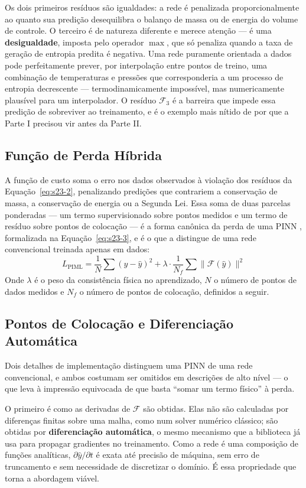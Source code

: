 \documentclass[12pt,a4paper]{article}
\numberwithin{equation}{section}
\numberwithin{table}{section}
\numberwithin{figure}{section}
\begin{document}
	Os dois primeiros resíduos são igualdades: a rede é penalizada proporcionalmente ao quanto sua predição desequilibra o balanço de massa ou de energia do volume de controle. O terceiro é de natureza diferente e merece atenção — é uma \textbf{desigualdade}, imposta pelo operador $\max$, que só penaliza quando a taxa de geração de entropia predita é negativa. Uma rede puramente orientada a dados pode perfeitamente prever, por interpolação entre pontos de treino, uma combinação de temperaturas e pressões que corresponderia a um processo de entropia decrescente — termodinamicamente impossível, mas numericamente plausível para um interpolador. O resíduo $\mathcal{F}_3$ é a barreira que impede essa predição de sobreviver ao treinamento, e é o exemplo mais nítido de por que a Parte I precisou vir antes da Parte II.

	\subsection{Função de Perda Híbrida}
	A função de custo soma o erro nos dados observados à violação dos resíduos da Equação~\eqref{eq:s23-2}, penalizando predições que contrariem a conservação de massa, a conservação de energia ou a Segunda Lei. Essa soma de duas parcelas ponderadas — um termo supervisionado sobre pontos medidos e um termo de resíduo sobre pontos de colocação — é a forma canônica da perda de uma PINN \cite{piml}, formalizada na Equação~\eqref{eq:s23-3}, e é o que a distingue de uma rede convencional treinada apenas em dados:
	\begin{equation}\label{eq:s23-3}
 L_{\text{PIML}} = \frac{1}{N} \sum (y - \hat{y})^2 + \lambda \cdotp \frac{1}{N_f} \sum \| \mathcal{F}(\hat{y}) \|^2
\end{equation}
	Onde $\lambda$ é o peso da consistência física no aprendizado, $N$ o número de pontos de dados medidos e $N_f$ o número de pontos de colocação, definidos a seguir.

	\subsection{Pontos de Colocação e Diferenciação Automática}

	Dois detalhes de implementação distinguem uma PINN de uma rede convencional, e ambos costumam ser omitidos em descrições de alto nível — o que leva à impressão equivocada de que basta ``somar um termo físico'' à perda.

	O primeiro é como as derivadas de $\mathcal{F}$ são obtidas. Elas não são calculadas por diferenças finitas sobre uma malha, como num solver numérico clássico; são obtidas por \textbf{diferenciação automática}, o mesmo mecanismo que a biblioteca já usa para propagar gradientes no treinamento. Como a rede é uma composição de funções analíticas, $\partial \hat{y} / \partial t$ é exata até precisão de máquina, sem erro de truncamento e sem necessidade de discretizar o domínio. É essa propriedade que torna a abordagem viável.
\end{document}

